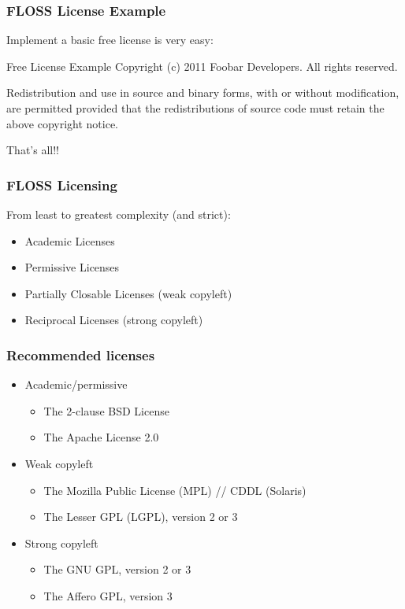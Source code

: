 \begin{frame}
\frametitle{FLOSS License Example}

Implement a basic free license is very easy: 

\begin{block}{Free License Example}
Copyright (c) 2011 Foobar Developers. All rights reserved. 

\medskip
Redistribution and use in source and binary forms, with or without modification, are permitted provided that the redistributions of source code must retain the above copyright notice.
\end{block}

\alert{That's all!!}

\end{frame}



\begin{frame}
\frametitle{FLOSS Licensing}

From least to greatest complexity (and strict):
\begin{itemize}
\item \alert{Academic Licenses}
\item \alert{Permissive Licenses}
\item \alert{Partially Closable Licenses} (weak copyleft)
\item \alert{Reciprocal Licenses} (strong copyleft)
\end{itemize}

\end{frame}


\begin{frame}
\frametitle{Recommended licenses}

\begin{itemize}
\item	Academic/permissive
	\begin{itemize}
	\item The 2-clause BSD License 
	\item The Apache License 2.0 
	\end{itemize}
\item Weak copyleft
	\begin{itemize}
	\item The Mozilla Public License (MPL) // CDDL (Solaris)
	\item The Lesser GPL (LGPL), version 2 or 3
	\end{itemize}
\item Strong copyleft
	\begin{itemize}
	\item The GNU GPL, version 2 or 3 
	\item The Affero GPL, version 3
	\end{itemize}
\end{itemize}

\end{frame}


